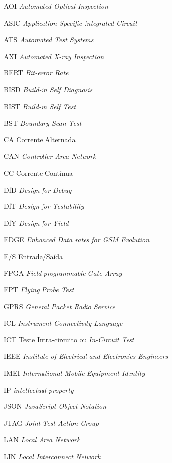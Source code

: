 \begin{siglas}
    \item [AOI] \textit{Automated Optical Inspection}
    \item [ASIC] \textit{Application-Specific Integrated Circuit}
    \item [ATS] \textit{Automated Test Systems}
    \item [AXI] \textit{Automated X-ray Inspection}
    \item [BERT] \textit{Bit-error Rate}
    \item [BISD] \textit{Build-in Self Diagnosis}
    \item [BIST] \textit{Build-in Self Test}
    \item [BST] \textit{Boundary Scan Test}
    \item [CA] Corrente Alternada
    \item [CAN] \textit{Controller Area Network}
    \item [CC] Corrente Contínua
    \item [DfD] \textit{Design for Debug}
    \item [DfT] \textit{Design for Testability}
    \item [DfY] \textit{Design for Yield}
    \item [EDGE] \textit{Enhanced Data rates for GSM Evolution}
    \item [E/S] Entrada/Saída
    \item [FPGA] \textit{Field-programmable Gate Array}
    \item [FPT] \textit{Flying Probe Test}
    \item [GPRS] \textit{General Packet Radio Service}
    \item [ICL] \textit{Instrument Connectivity Language} 
    \item [ICT] Teste Intra-circuito ou \textit{In-Circuit Test}
    \item [IEEE] \textit{Institute of Electrical and Electronics Engineers}
    \item [IMEI] \textit{International Mobile Equipment Identity}
    \item [IP] \textit{intellectual property}
    \item [JSON] \textit{JavaScript Object Notation}
    \item [JTAG] \textit{Joint Test Action Group}
    \item [LAN] \textit{Local Area Network}
    \item [LIN] \textit{Local Interconnect Network}

\end{siglas}
